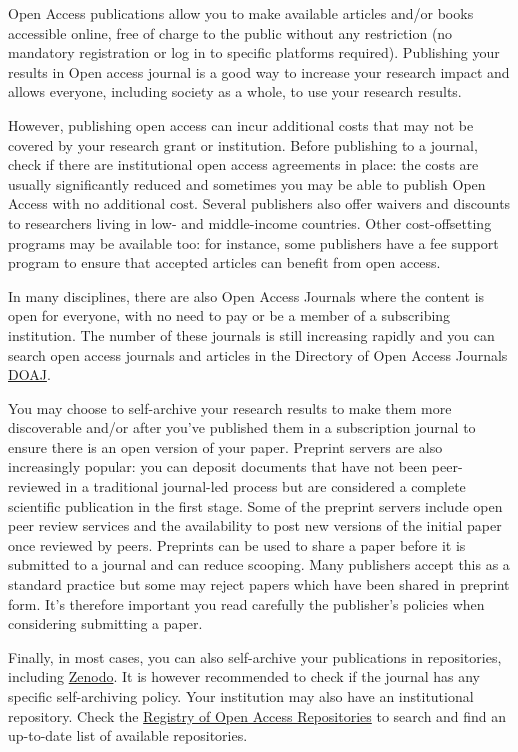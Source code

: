 \documentclass[
  letterpaper,
  DIV=11,
  numbers=noendperiod]{scrreport}
\begin{document}
Open Access publications allow you to make available articles and/or
books accessible online, free of charge to the public without any
restriction (no mandatory registration or log in to specific platforms
required). Publishing your results in Open access journal is a good way
to increase your research impact and allows everyone, including society
as a whole, to use your research results.

However, publishing open access can incur additional costs that may not
be covered by your research grant or institution. Before publishing to a
journal, check if there are institutional open access agreements in
place: the costs are usually significantly reduced and sometimes you may
be able to publish Open Access with no additional cost. Several
publishers also offer waivers and discounts to researchers living in
low- and middle-income countries. Other cost-offsetting programs may be
available too: for instance, some publishers have a fee support program
to ensure that accepted articles can benefit from open access.

In many disciplines, there are also Open Access Journals where the
content is open for everyone, with no need to pay or be a member of a
subscribing institution. The number of these journals is still
increasing rapidly and you can search open access journals and articles
in the Directory of Open Access Journals
\href{https://www.doaj.org/}{DOAJ}.

You may choose to self-archive your research results to make them more
discoverable and/or after you've published them in a subscription
journal to ensure there is an open version of your paper. Preprint
servers are also increasingly popular: you can deposit documents that
have not been peer-reviewed in a traditional journal-led process but are
considered a complete scientific publication in the first stage. Some of
the preprint servers include open peer review services and the
availability to post new versions of the initial paper once reviewed by
peers. Preprints can be used to share a paper before it is submitted to
a journal and can reduce scooping. Many publishers accept this as a
standard practice but some may reject papers which have been shared in
preprint form. It's therefore important you read carefully the
publisher's policies when considering submitting a paper.

Finally, in most cases, you can also self-archive your publications in
repositories, including \href{https://zenodo.org/}{Zenodo}. It is
however recommended to check if the journal has any specific
self-archiving policy. Your institution may also have an institutional
repository. Check the \href{http://roar.eprints.org/}{Registry of Open
Access Repositories} to search and find an up-to-date list of available
repositories.
\end{document}
